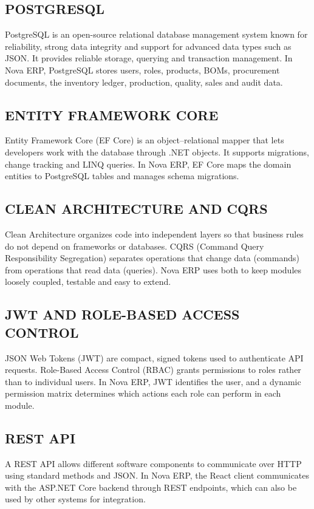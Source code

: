\documentclass[12pt,a4paper]{report}
\begin{document}
\subsection{POSTGRESQL}
PostgreSQL is an open-source relational database management system known for reliability, strong data integrity and support for advanced data types such as JSON. It provides reliable storage, querying and transaction management. In Nova ERP, PostgreSQL stores users, roles, products, BOMs, procurement documents, the inventory ledger, production, quality, sales and audit data.

\subsection{ENTITY FRAMEWORK CORE}
Entity Framework Core (EF Core) is an object--relational mapper that lets developers work with the database through .NET objects. It supports migrations, change tracking and LINQ queries. In Nova ERP, EF Core maps the domain entities to PostgreSQL tables and manages schema migrations.

\subsection{CLEAN ARCHITECTURE AND CQRS}
Clean Architecture organizes code into independent layers so that business rules do not depend on frameworks or databases. CQRS (Command Query Responsibility Segregation) separates operations that change data (commands) from operations that read data (queries). Nova ERP uses both to keep modules loosely coupled, testable and easy to extend.

\subsection{JWT AND ROLE-BASED ACCESS CONTROL}
JSON Web Tokens (JWT) are compact, signed tokens used to authenticate API requests. Role-Based Access Control (RBAC) grants permissions to roles rather than to individual users. In Nova ERP, JWT identifies the user, and a dynamic permission matrix determines which actions each role can perform in each module.

\subsection{REST API}
A REST API allows different software components to communicate over HTTP using standard methods and JSON. In Nova ERP, the React client communicates with the ASP.NET Core backend through REST endpoints, which can also be used by other systems for integration.
\end{document}
